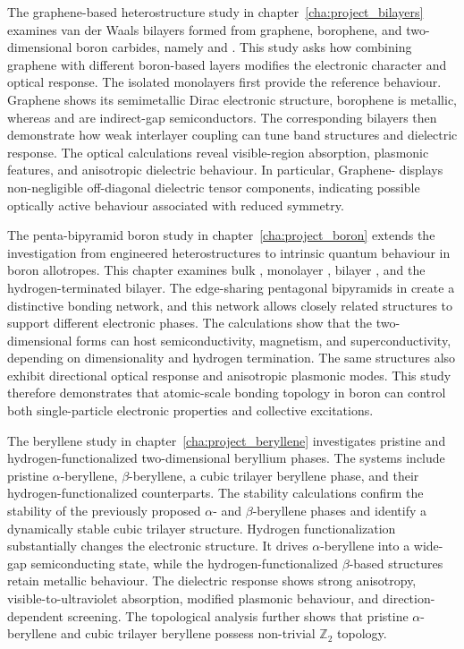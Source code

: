The graphene-based heterostructure study in chapter~\ref{cha:project_bilayers} examines van der Waals bilayers formed from graphene, borophene, and two-dimensional boron carbides, namely  and .
This study asks how combining graphene with different boron-based layers modifies the electronic character and optical response.
The isolated monolayers first provide the reference behaviour.
Graphene shows its semimetallic Dirac electronic structure, borophene is metallic, whereas  and  are indirect-gap semiconductors.
The corresponding bilayers then demonstrate how weak interlayer coupling can tune band structures and dielectric response.
The optical calculations reveal visible-region absorption, plasmonic features, and anisotropic dielectric behaviour.
In particular, Graphene- displays non-negligible off-diagonal dielectric tensor components, indicating possible optically active behaviour associated with reduced symmetry.

The penta-bipyramid boron study in chapter~\ref{cha:project_boron} extends the investigation from engineered heterostructures to intrinsic quantum behaviour in boron allotropes.
This chapter examines bulk , monolayer , bilayer , and the hydrogen-terminated bilayer.
The edge-sharing pentagonal bipyramids in  create a distinctive bonding network, and this network allows closely related structures to support different electronic phases.
The calculations show that the two-dimensional forms can host semiconductivity, magnetism, and superconductivity, depending on dimensionality and hydrogen termination.
The same structures also exhibit directional optical response and anisotropic plasmonic modes.
This study therefore demonstrates that atomic-scale bonding topology in boron can control both single-particle electronic properties and collective excitations.

The beryllene study in chapter~\ref{cha:project_beryllene} investigates pristine and hydrogen-functionalized two-dimensional beryllium phases.
The systems include pristine \(\alpha\)-beryllene, \(\beta\)-beryllene, a cubic trilayer beryllene phase, and their hydrogen-functionalized counterparts.
The stability calculations confirm the stability of the previously proposed \(\alpha\)- and \(\beta\)-beryllene phases and identify a dynamically stable cubic trilayer structure.
Hydrogen functionalization substantially changes the electronic structure.
It drives \(\alpha\)-beryllene into a wide-gap semiconducting state, while the hydrogen-functionalized \(\beta\)-based structures retain metallic behaviour.
The dielectric response shows strong anisotropy, visible-to-ultraviolet absorption, modified plasmonic behaviour, and direction-dependent screening.
The topological analysis further shows that pristine \(\alpha\)-beryllene and cubic trilayer beryllene possess non-trivial \(\mathbb{Z}_2\) topology.

